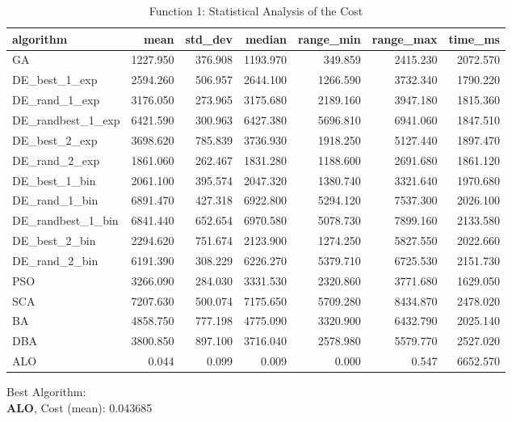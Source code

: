 \documentclass[12pt]{article}
\begin{document}
\begin{table}[H]
    \centering
    \footnotesize
    \begin{adjustbox}{width=1\textwidth}
        \begin{tabular}{lrrrrrr}
            \toprule
            algorithm &     mean &  std\_dev &   median &  range\_min &  range\_max &  time\_ms \\
            \midrule
            GA & 1227.950 & 376.908 & 1193.970 & 349.859 & 2415.230 & 2072.570 \\
            DE\_best\_1\_exp & 2594.260 & 506.957 & 2644.100 & 1266.590 & 3732.340 & 1790.220 \\
            DE\_rand\_1\_exp & 3176.050 & 273.965 & 3175.680 & 2189.160 & 3947.180 & 1815.360 \\
            DE\_randbest\_1\_exp & 6421.590 & 300.963 & 6427.380 & 5696.810 & 6941.060 & 1847.510 \\
            DE\_best\_2\_exp & 3698.620 & 785.839 & 3736.930 & 1918.250 & 5127.440 & 1897.470 \\
            DE\_rand\_2\_exp & 1861.060 & 262.467 & 1831.280 & 1188.600 & 2691.680 & 1861.120 \\
            DE\_best\_1\_bin & 2061.100 & 395.574 & 2047.320 & 1380.740 & 3321.640 & 1970.680 \\
            DE\_rand\_1\_bin & 6891.470 & 427.318 & 6922.800 & 5294.120 & 7537.300 & 2026.100 \\
            DE\_randbest\_1\_bin & 6841.440 & 652.654 & 6970.580 & 5078.730 & 7899.160 & 2133.580 \\
            DE\_best\_2\_bin & 2294.620 & 751.674 & 2123.900 & 1274.250 & 5827.550 & 2022.660 \\
            DE\_rand\_2\_bin & 6191.390 & 308.229 & 6226.270 & 5379.710 & 6725.530 & 2151.730 \\
            PSO & 3266.090 & 284.030 & 3331.530 & 2320.860 & 3771.680 & 1629.050 \\
            SCA & 7207.630 & 500.074 & 7175.650 & 5709.280 & 8434.870 & 2478.020 \\
            BA & 4858.750 & 777.198 & 4775.090 & 3320.900 & 6432.790 & 2025.140 \\
            DBA & 3800.850 & 897.100 & 3716.040 & 2578.980 & 5579.770 & 2527.020 \\
            ALO & 0.044 & 0.099 & 0.009 & 0.000 & 0.547 & 6652.570 \\
            \bottomrule
        \end{tabular}
        
        
    \end{adjustbox}
    \caption{Function 1: Statistical Analysis of the Cost} 
\end{table}
Best Algorithm: \\
\textbf{ALO}, Cost (mean): 0.043685\\
\newpage
\end{document}
